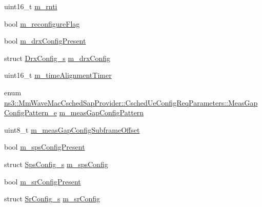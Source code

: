 \begin{DoxyCompactItemize}
\item 
uint16\+\_\+t \hyperlink{structns3_1_1MmWaveMacCschedSapProvider_1_1CschedUeConfigReqParameters_a5036f49fc34da05434ed60198fd4ddd0}{m\+\_\+rnti}
\item 
bool \hyperlink{structns3_1_1MmWaveMacCschedSapProvider_1_1CschedUeConfigReqParameters_a99b5624c4c6d94a46442fe3166e343e7}{m\+\_\+reconfigure\+Flag}
\item 
bool \hyperlink{structns3_1_1MmWaveMacCschedSapProvider_1_1CschedUeConfigReqParameters_ad03a16f373da2d1d016392c262fa9de0}{m\+\_\+drx\+Config\+Present}
\item 
struct \hyperlink{structns3_1_1DrxConfig__s}{Drx\+Config\+\_\+s} \hyperlink{structns3_1_1MmWaveMacCschedSapProvider_1_1CschedUeConfigReqParameters_a1590eff07241ec8a6d415efc58cf5e94}{m\+\_\+drx\+Config}
\item 
uint16\+\_\+t \hyperlink{structns3_1_1MmWaveMacCschedSapProvider_1_1CschedUeConfigReqParameters_a9e5ca3c9a02e2459d1c432a6d82294fc}{m\+\_\+time\+Alignment\+Timer}
\item 
enum \hyperlink{structns3_1_1MmWaveMacCschedSapProvider_1_1CschedUeConfigReqParameters_a2d053eff9777b68e1637a2201b69fe7b}{ns3\+::\+Mm\+Wave\+Mac\+Csched\+Sap\+Provider\+::\+Csched\+Ue\+Config\+Req\+Parameters\+::\+Meas\+Gap\+Config\+Pattern\+\_\+e} \hyperlink{structns3_1_1MmWaveMacCschedSapProvider_1_1CschedUeConfigReqParameters_ac5c0b21171cb1eaa373396a6407173f7}{m\+\_\+meas\+Gap\+Config\+Pattern}
\item 
uint8\+\_\+t \hyperlink{structns3_1_1MmWaveMacCschedSapProvider_1_1CschedUeConfigReqParameters_a2325593806b0518aaee4ee1e32bcb956}{m\+\_\+meas\+Gap\+Config\+Subframe\+Offset}
\item 
bool \hyperlink{structns3_1_1MmWaveMacCschedSapProvider_1_1CschedUeConfigReqParameters_a2dca94cfe679adf92eecab66202ef5fe}{m\+\_\+sps\+Config\+Present}
\item 
struct \hyperlink{structns3_1_1SpsConfig__s}{Sps\+Config\+\_\+s} \hyperlink{structns3_1_1MmWaveMacCschedSapProvider_1_1CschedUeConfigReqParameters_ab2ade7810a76f0d047ff736590b89922}{m\+\_\+sps\+Config}
\item 
bool \hyperlink{structns3_1_1MmWaveMacCschedSapProvider_1_1CschedUeConfigReqParameters_afd105d250348f40787a1540bc228170d}{m\+\_\+sr\+Config\+Present}
\item 
struct \hyperlink{structns3_1_1SrConfig__s}{Sr\+Config\+\_\+s} \hyperlink{structns3_1_1MmWaveMacCschedSapProvider_1_1CschedUeConfigReqParameters_a5cce1916b05bf1ed6a160af70473e564}{m\+\_\+sr\+Config}

\end{DoxyCompactItemize}
